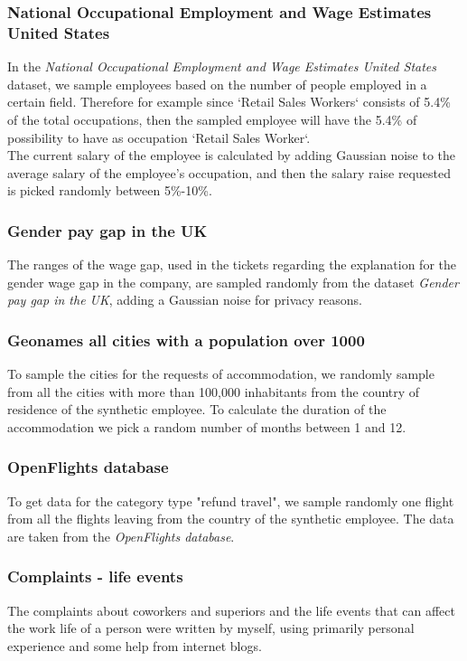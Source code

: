 \subsubsection*{National Occupational Employment and Wage Estimates United States}
In the \textit{National Occupational Employment and Wage Estimates United States} dataset, we sample employees based on the number of people employed in a certain field. Therefore for example since `Retail Sales Workers` consists of 5.4\% of the total occupations, then the sampled employee will have the 5.4\% of possibility to have as occupation `Retail Sales Worker`. \\
The current salary of the employee is calculated by adding Gaussian noise to the average salary of the employee's occupation, and then the salary raise requested is picked randomly between 5\%-10\%. 
\subsubsection*{Gender pay gap in the UK}
The ranges of the wage gap, used in the tickets regarding the explanation for the gender wage gap in the company, are sampled randomly from the dataset \textit{Gender pay gap in the UK}, adding a Gaussian noise for privacy reasons. 
\subsubsection*{Geonames all cities with a population over 1000}
To sample the cities for the requests of accommodation, we randomly sample from all the cities with more than 100,000 inhabitants from the country of residence of the synthetic employee. To calculate the duration of the accommodation we pick a random number of months between 1 and 12. 
\subsubsection*{OpenFlights database}
To get data for the category type "refund travel", we sample randomly one flight from all the flights leaving from the country of the synthetic employee. The data are taken from the \textit{OpenFlights database}.
\subsubsection*{Complaints - life events}
The complaints about coworkers and superiors and the life events that can affect the work life of a person were written by myself, using primarily personal experience and some help from internet blogs.